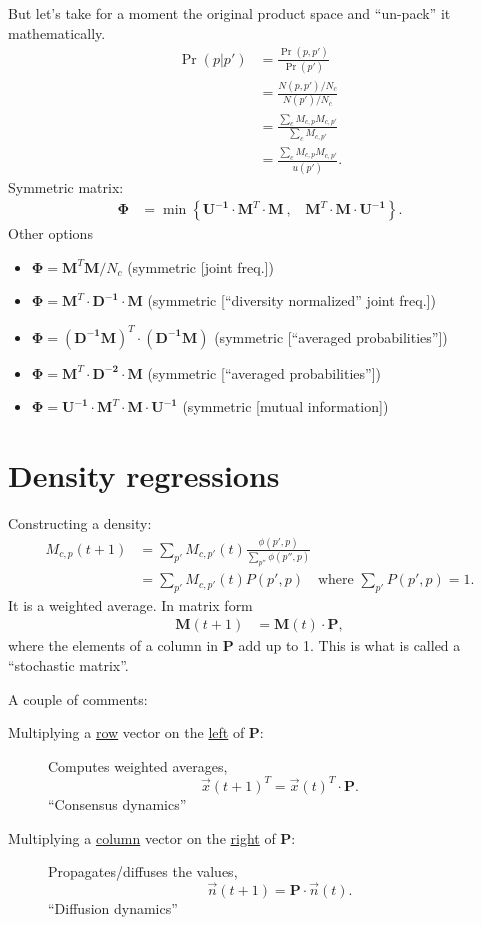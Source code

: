 \documentclass[12pt]{article}
\newcommand{\mtx}[1]{\mathbf{ #1}}
\begin{document}
But let's take for a moment the original product space and ``un-pack'' it mathematically.
\begin{align}
	\Pr(p|p') &= \frac{\Pr(p,p')}{\Pr(p')} \nonumber \\
	&= \frac{N(p,p')/N_c}{N(p')/N_c} \nonumber \\
	&= \frac{\sum_c M_{c,p}M_{c,p'}}{\sum_c M_{c,p'}}  \nonumber \\
	&= \frac{\sum_c M_{c,p}M_{c,p'}}{u(p')}. 
\end{align}
Symmetric matrix:
\begin{align*}
	\mtx{\Phi} &= \min\left\{\mtx{U^{-1}}\cdot\mtx{M}^T\cdot\mtx{M}~,~~~~ \mtx{M}^T\cdot\mtx{M}\cdot\mtx{U^{-1}}\right\}.
\end{align*}
Other options
\begin{itemize}
	\item $\mtx{\Phi} = \mtx{M}^T\mtx{M}/N_c$ (symmetric [joint freq.])
	\item $\mtx{\Phi} = \mtx{M}^T\cdot\mtx{D^{-1}}\cdot\mtx{M}$ (symmetric [``diversity normalized'' joint freq.])
	\item $\mtx{\Phi} = (\mtx{D^{-1}}\mtx{M})^T\cdot(\mtx{D^{-1}}\mtx{M})$ (symmetric [``averaged probabilities''])
	\item $\mtx{\Phi} = \mtx{M}^T\cdot\mtx{D^{-2}}\cdot\mtx{M}$ (symmetric [``averaged probabilities''])
	\item $\mtx{\Phi} = \mtx{U^{-1}}\cdot\mtx{M}^T\cdot\mtx{M}\cdot\mtx{U^{-1}}$ (symmetric [mutual information])
\end{itemize}


\newpage
\section{Density regressions}
Constructing a density:
\begin{align}
	M_{c,p}(t+1) &= \sum_{p'} M_{c,p'}(t)\frac{\phi(p', p)}{\sum_{p''}\phi(p'', p)} \nonumber\\
	&= \sum_{p'} M_{c,p'}(t)P(p', p)\quad\text{where $\sum_{p'} P(p', p) = 1$}.
\end{align}
It is a weighted average. In matrix form
\begin{align}
	\mtx{M}(t+1) &= \mtx{M}(t)\cdot \mtx{P},
\end{align}
where the elements of a column in $\mtx{P}$ add up to 1. This is what is called a ``stochastic matrix''.

A couple of comments:
\begin{description}
	\item[Multiplying a \underline{row} vector on the \underline{left} of $\mtx{P}$:] 
	Computes weighted averages, $$\vec{x}(t+1)^T = \vec{x}(t)^T\cdot\mtx{P}.$$
	``Consensus dynamics''
	\item[Multiplying a \underline{column} vector on the \underline{right} of $\mtx{P}$:] 
	Propagates/diffuses the values, $$\vec{n}(t+1) = \mtx{P}\cdot\vec{n}(t).$$
	``Diffusion dynamics''
\end{description}
\end{document}
